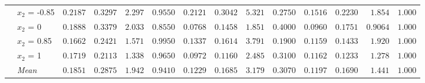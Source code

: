 \begin{table}[htbp]
\begin{tabular}{llrrrrrrrrrrrr}
 & $x_2$ = -0.85 & $0.2187$ & $0.3297$ & $2.297$ & {\boldmath$0.9550$} & $0.2121$ & $0.3042$ & $5.321$ & $0.2750$ & {\boldmath$0.1516$} & {\boldmath$0.2230$} & {\boldmath$1.854$} & $1.000$ \\
 & $x_2$ = 0 & $0.1888$ & $0.3379$ & $2.033$ & $0.8550$ & {\boldmath$0.0768$} & {\boldmath$0.1458$} & $1.851$ & $0.4000$ & $0.0960$ & $0.1751$ & {\boldmath$0.9064$} & {\boldmath$1.000$} \\
 & $x_2$ = 0.85 & $0.1662$ & $0.2421$ & {\boldmath$1.571$} & {\boldmath$0.9950$} & $0.1337$ & $0.1614$ & $3.791$ & $0.1900$ & {\boldmath$0.1159$} & {\boldmath$0.1433$} & $1.920$ & $1.000$ \\
 & $x_2$ = 1 & $0.1719$ & $0.2113$ & $1.338$ & {\boldmath$0.9650$} & {\boldmath$0.0972$} & {\boldmath$0.1160$} & $2.485$ & $0.3100$ & $0.1162$ & $0.1233$ & {\boldmath$1.278$} & $1.000$ \\
 & \textit{Mean} & $0.1851$ & $0.2875$ & $1.942$ & \colorbox{green!20}{\boldmath$0.9410$} & $0.1229$ & \colorbox{green!20}{\boldmath$0.1685$} & $3.179$ & $0.3070$ & \colorbox{green!20}{\boldmath$0.1197$} & $0.1690$ & \colorbox{green!20}{\boldmath$1.441$} & $1.000$ \\
\bottomrule
\end{tabular}
\end{table}
